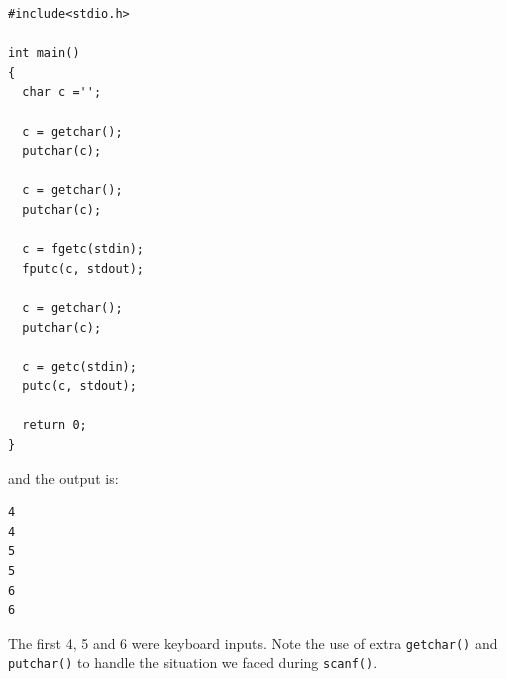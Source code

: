 \begin{Verbatim}[frame=single]
#include<stdio.h>

int main()
{
  char c ='';

  c = getchar();
  putchar(c);

  c = getchar();
  putchar(c);

  c = fgetc(stdin);
  fputc(c, stdout);

  c = getchar();
  putchar(c);

  c = getc(stdin);
  putc(c, stdout);

  return 0;
}
\end{Verbatim}

and the output is:

\begin{Verbatim}[frame=single]
4
4
5
5
6
6
\end{Verbatim}

The first 4, 5 and 6 were keyboard inputs. Note the use of extra
\texttt{getchar()} and \texttt{putchar()} to handle the situation we faced
during \texttt{scanf()}.


